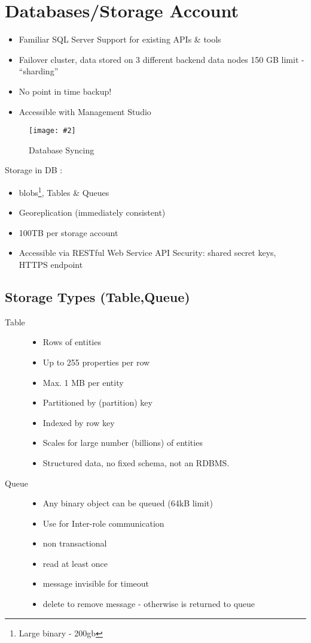 \documentclass[a4paper,10pt]{scrreprt}
\newcommand{\pic}[2][figure]{\begin{figure}[h]
 \centering
 \texttt{[image: \#2]}
 \caption{#1}
\end{figure}
}
\begin{document}
\section{Databases/Storage Account}
\begin{itemize}
\item Familiar SQL Server
 Support for existing APIs \& tools
\item Failover cluster, data stored on 3
different backend data nodes
150 GB limit - ``sharding''
\item No point in time backup!
\item Accessible with Management
Studio 
\end{itemize}

\pic[Database Syncing]{dbds.png}

Storage in DB :
\begin{itemize}
\item  blobs\footnote{Large binary - 200gb}, Tables \& Queues
\item Georeplication (immediately
consistent)
\item 100TB per storage account
\item Accessible via RESTful Web
Service API
Security: shared secret keys,
HTTPS endpoint
\end{itemize}

\subsection{Storage Types (Table,Queue)}
\begin{description}
 \item [Table] \begin{itemize}
              \item   Rows of entities
\item  Up to 255 properties per row
\item  Max. 1 MB per entity
\item  Partitioned by (partition) key
\item  Indexed by row key
\item Scales for large number
(billions) of entities
\item  Structured data, no fixed schema,
not an RDBMS.
\end{itemize}
\item[Queue] \begin{itemize}
              \item Any binary object can be queued
(64kB limit)
\item Use for Inter-role communication
\item  non transactional
\item  read at least once
\item  message invisible for timeout
\item  delete to remove message -
otherwise is returned to queue
\end{itemize}


\end{description}
\end{document}
